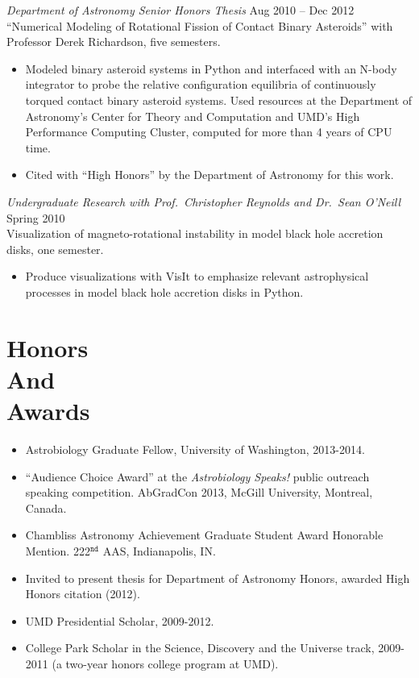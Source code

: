 \documentclass[margin]{res}
\begin{document}
\begin{resume}
      {\sl Department of Astronomy Senior Honors Thesis} \hfill Aug 2010 -- Dec 2012 \\
                ``Numerical Modeling of Rotational Fission of Contact Binary Asteroids'' with Professor Derek Richardson, five semesters. 
                 \begin{itemize}   
                 \item Modeled binary asteroid systems in Python and interfaced with an N-body integrator to probe the relative configuration equilibria of continuously torqued 
contact binary asteroid systems. Used resources at the Department of Astronomy's Center for Theory and Computation 
and UMD's High Performance Computing Cluster, computed for more than 4 years of CPU time. 
                \item  Cited with ``High Honors'' by the Department of Astronomy for this work.
                \end{itemize}

                {\sl Undergraduate Research with Prof.\ Christopher Reynolds and Dr.\ Sean O'Neill} \hfill        Spring 2010 \\
                Visualization of magneto-rotational instability in model black hole accretion disks, one semester.
                  \begin{itemize}  
                   \item Produce visualizations with VisIt to emphasize relevant astrophysical processes in model black hole accretion disks in Python. \\
                   \end{itemize} 

\section{Honors\\And\\Awards} 
                 \begin{itemize}   
                  \item Astrobiology Graduate Fellow, University of Washington, 2013-2014.
                  \item ``Audience Choice Award'' at the \textit{Astrobiology Speaks!} public outreach speaking competition. AbGradCon 2013, McGill University, Montreal, Canada. 
                  \item Chambliss Astronomy Achievement Graduate Student Award Honorable Mention. 222$^{\mathtt{nd}}$ AAS, Indianapolis, IN.
		\item Invited to present thesis for Department of Astronomy Honors, awarded High Honors citation (2012).
                  \item UMD Presidential Scholar, 2009-2012.
		\item College Park Scholar in the Science, Discovery and the Universe track, 2009-2011 (a two-year honors 
		college program at UMD). \\
                 \end{itemize}


\end{resume}
\end{document}
